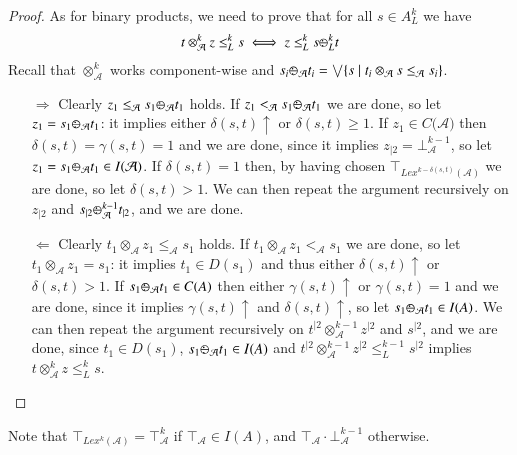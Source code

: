 \documentclass[a4paper]{elsarticle}
\newcommand{\1}{\mathbf{1}}
\def\odiv{{ \ominus\hspace{-8pt}:}\;}
\begin{document}
\begin{proof}
As for binary products, we need to prove that for all $s \in A^k_L$ we have
$$t \otimes^k_\mathcal{A} z \leq^k_L s \iff z \leq^k_L s \odiv^k_L t$$
%
Recall that $\otimes^k_\mathcal{A}$ works component-wise and 
$s_i \odiv_\mathcal{A} t_i = \bigvee \{s \mid t_i \otimes_\mathcal{A} s \leq_\mathcal{A} s_i\}$.

\begin{itemize}
\item[$\Rightarrow$] Clearly $z_1 \leq_\mathcal{A} s_1 \odiv_\mathcal{A} t_1$ holds.
If $z_1 <_\mathcal{A} s_1 \odiv_\mathcal{A} t_1$ we are done, so let 
$z_1 = s_1 \odiv_\mathcal{A} t_1$: it implies either $\delta(s,t){\uparrow}$ or $\delta(s,t) \geq 1$.
If $z_1 \in C(\mathcal{A)}$ then $\delta(s,t) = \gamma(s,t) = 1$ and we are done, 
since it implies $z_{\mid 2} = \bot^{k-1}_\mathcal{A}$, so let $z_1 = s_1 \odiv_\mathcal{A} t_1 \in I(\mathcal{A)}$.
If $\delta(s,t) = 1$ then, by having chosen $\top_{Lex^{k-\delta(s,t)}(\mathcal{A})}$ we are done, so let $\delta(s,t) > 1$.
We can then repeat the argument recursively on $z_{\mid 2}$ and $s_{\mid 2} \odiv^{k-1}_\mathcal{A} t_{\mid 2}$, 
and we are done.

\item[$\Leftarrow$]
Clearly $t_1 \otimes_\mathcal{A} z_1 \leq_\mathcal{A} s_1$ holds.
If $t_1 \otimes_\mathcal{A} z_1 <_\mathcal{A} s_1$ we are done, so let 
$t_1 \otimes_\mathcal{A} z_1 = s_1$: it implies $t_1 \in D(s_1)$ and thus either $\delta(s,t){\uparrow}$ or $\delta(s,t) > 1$.
If $s_1 \odiv_\mathcal{A} t_1 \in C(A)$ then either $\gamma(s,t){\uparrow}$ or $\gamma(s,t)=1$
and we are done, since it implies $\gamma(s,t){\uparrow}$ and $\delta(s,t){\uparrow}$,
so let $s_1 \odiv_\mathcal{A} t_1 \in I(A)$.
We can then repeat the argument recursively on $t^{\mid 2} \otimes^{k-1}_\mathcal{A} z^{\mid 2}$ and
$s^{\mid 2}$, and we are done,
since $t_1 \in D(s_1)$,
$s_1 \odiv_\mathcal{A} t_1 \in I(A)$ 
and $t^{\mid 2} \otimes^{k-1}_\mathcal{A} z^{\mid 2} \leq^{k-1}_L s^{\mid 2}$
implies 
$t \otimes^k_\mathcal{A} z \leq^k_L s$.
\end{itemize}
\end{proof}

Note that $\top_{Lex^k(\mathcal{A})} = \top^k_\mathcal{A}$
if $\top_\mathcal{A} \in I(A)$, and  $\top_\mathcal{A} \cdot \bot^{k-1}_\mathcal{A}$ 
otherwise.
\end{document}
